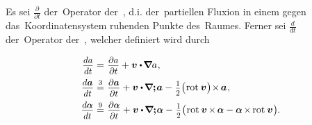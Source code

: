 \nopagebreak\begin{tcolorbox}[breakable, enhanced, colback = orange!8, before upper={\parindent3.2ex}, parbox = false]
\small%
\setlength{\abovedisplayskip}{2pt}\setlength{\belowdisplayskip}{2pt}%

Es sei ${\frac{\partial}{\partial t}}$ der~Operator der~, d.\:i. der~partiellen Fluxion in einem gegen das~Koordinatensystem ruhenden Punkte des~Raumes. Ferner sei ${\frac{d}{dt}}$ der~Operator der~, welcher definiert wird durch

\nopagebreak\vspace{.1em}\begin{equation*}
\begin{array}{r@{\hspace{.66ex}}c@{\hspace{.75ex}}l}
\scalebox{0.92}[0.92]{$\displaystyle\frac{\raisemath{-0.125em}{da}}{dt}$} & = & \scalebox{0.92}[0.92]{$\displaystyle\frac{\raisemath{-0.125em}{\partial a}}{\partial t}$} + \bm{v} \dotp \hspace{-0.2ex} \boldnabla a
\hspace{.1ex} ,
\\[.8em]
\scalebox{0.92}[0.92]{$\displaystyle\frac{\raisemath{-0.125em}{d \bm{a}}}{dt}$} & \stackrel{3}{=} & \scalebox{0.92}[0.92]{$\displaystyle\frac{\raisemath{-0.125em}{\partial \bm{a}}}{\partial t}$} + \bm{v} \dotp \hspace{-0.2ex} \boldnabla\bm{;} \hspace{-0.26ex} \bm{a} - \hspace{.1ex} \smalldisplaystyleonehalf \bigl( \hspace{.1ex} \operatorname{rot}\hspace{.1ex} \bm{v} \hspace{.1ex} \bigr) \hspace{-0.4ex} \times \hspace{-0.2ex} \bm{a}
\hspace{.1ex} ,
\\[.8em]
\scalebox{0.92}[0.92]{$\displaystyle\frac{\raisemath{-0.125em}{d \mathboldalpha}}{dt}$} & \stackrel{9}{=} & \scalebox{0.92}[0.92]{$\displaystyle\frac{\raisemath{-0.125em}{\partial \mathboldalpha}}{\partial t}$} + \bm{v} \dotp \hspace{-0.2ex} \boldnabla\bm{;} \hspace{-0.28ex} \mathboldalpha - \hspace{.1ex} \smalldisplaystyleonehalf \bigl( \hspace{.1ex} \operatorname{rot}\hspace{.1ex} \bm{v} \hspace{-0.2ex} \times \hspace{-0.2ex} \mathboldalpha - \mathboldalpha \hspace{-0.2ex} \times \hspace{-0.2ex} \operatorname{rot}\hspace{.1ex} \bm{v} \hspace{.1ex} \bigr)
\hspace{-0.1ex} .
\end{array}
\end{equation*}


\end{tcolorbox}
